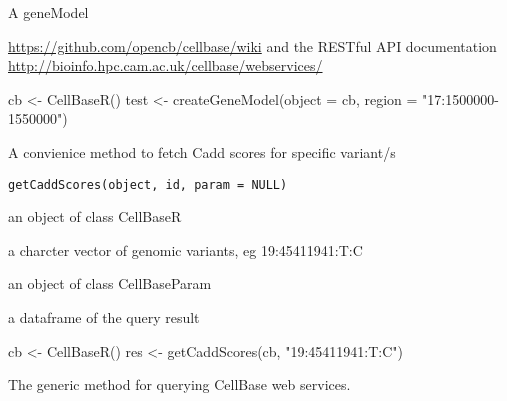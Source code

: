 \documentclass[letterpaper]{book}
\begin{document}
%
\begin{Value}
A geneModel
\end{Value}
%
\begin{SeeAlso}\relax
\url{https://github.com/opencb/cellbase/wiki} 
and the RESTful API documentation 
\url{http://bioinfo.hpc.cam.ac.uk/cellbase/webservices/}
\end{SeeAlso}
%
\begin{Examples}
\begin{ExampleCode}
cb <- CellBaseR()
test <- createGeneModel(object = cb, region = "17:1500000-1550000")
\end{ExampleCode}
\end{Examples}
%
\begin{Description}\relax
A convienice method to fetch Cadd scores for specific variant/s
\end{Description}
%
\begin{Usage}
\begin{verbatim}
getCaddScores(object, id, param = NULL)
\end{verbatim}
\end{Usage}
%
\begin{Arguments}
\begin{ldescription}
\item[\code{object}] an object of class CellBaseR

\item[\code{id}] a charcter vector of genomic variants, eg 19:45411941:T:C

\item[\code{param}] an object of class CellBaseParam
\end{ldescription}
\end{Arguments}
%
\begin{Value}
a dataframe of the query result
\end{Value}
%
\begin{Examples}
\begin{ExampleCode}
cb <- CellBaseR()
res <- getCaddScores(cb, "19:45411941:T:C")
\end{ExampleCode}
\end{Examples}
%
\begin{Description}\relax
The generic method for querying CellBase web services.
\end{Description}
\end{document}
